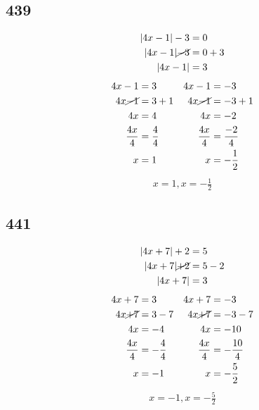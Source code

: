 \documentclass{article}
\begin{document}
    \subsection*{439}
    \begin{align*}
        |4x - 1| -3 &= 0 \\
        |4x - 1| \cancel{-3} &= 0 + 3 \\
        |4x - 1| &= 3 \\
    \end{align*}
    \begin{align*}
        4x - 1 &= 3 &4x - 1 &= -3\\
        4x \cancel{- 1} &= 3 + 1 &4x \cancel{- 1} &= -3 + 1\\
        4x  &=  4 &4x  &= -2\\
        \frac{4x}{4}  &=  \frac{4}{4} &\frac{4x}{4}  &= \frac{-2}{4}\\
        x &= 1  &x &= -\frac{1}{2}\\
    \end{align*}
    \begin{align*}
        \boxed{x = 1, x = -\frac{1}{2}}
    \end{align*}

    \subsection*{441}
    \begin{align*}
        |4x +7| +2 &= 5 \\
        |4x +7| \cancel{+2} &= 5 - 2 \\
        |4x +7|  &= 3 \\
    \end{align*}
    \begin{align*}
        4x +7 &= 3 &4x +7 &= -3\\
        4x \cancel{+ 7} &= 3 -7 &4x \cancel{+ 7} &= -3 -7\\
        4x  &=  -4 &4x  &= -10\\
        \frac{4x}{4}  &=  -\frac{4}{4} &\frac{4x}{4}  &= -\frac{10}{4}\\
        x &= -1  &x &= -\frac{5}{2}\\
    \end{align*}
    \begin{align*}
        \boxed{x = -1, x = -\frac{5}{2}}
    \end{align*}
\end{document}

